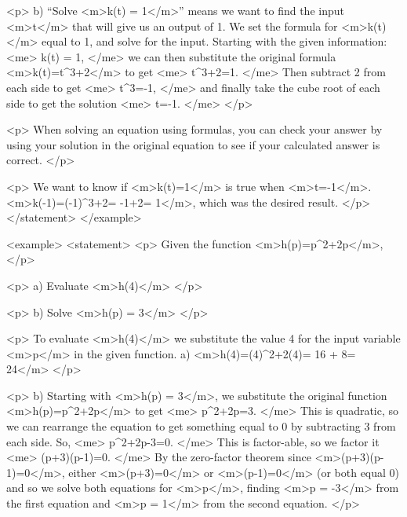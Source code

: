                 <p>
                    b) “Solve <m>k(t) = 1</m>” means we want to find the input <m>t</m> that will give us an output of 1.
                    We set the formula for <m>k(t)</m> equal to 1, and solve for the input.
                    Starting with the given information:
                    <me>
                        k(t) = 1,
                    </me>
                    we can then substitute the original formula <m>k(t)=t^{3}+2</m> to get
                    <me>
                        t^{3}+2=1.
                    </me>
                    Then subtract 2 from each side to get
                    <me>
                        t^{3}=-1,
                    </me>
                    and finally take the cube root of each side to get the solution
                    <me>
                        t=-1.
                    </me>
                </p>

                <p>
                    When solving an equation using formulas, you can check your answer by using your solution in the original equation to see if your calculated answer is correct.
                </p>

                <p>
                    We want to know if <m>k(t)=1</m> is true when <m>t=-1</m>.
                    <m>k(-1)=(-1)^{3}+2= -1+2= 1</m>, which was the desired result.
                </p>
            </statement>
        </example>

        <example>
            <statement>
                <p>
                    Given the function <m>h(p)=p^{2}+2p</m>,
                </p>

                <p>
                    a) Evaluate <m>h(4)</m>
                </p>

                <p>
                    b) Solve <m>h(p) = 3</m>
                </p>

                <p>
                    To evaluate <m>h(4)</m> we substitute the value 4 for the input variable <m>p</m> in the given function.
                    a) <m>h(4)=(4)^{2}+2(4)= 16 + 8= 24</m>
                </p>

                <p>
                    b) Starting with <m>h(p) = 3</m>, we substitute the original function <m>h(p)=p^{2}+2p</m> to get
                    <me>
                        p^{2}+2p=3.
                    </me>
                    This is quadratic, so we can rearrange the equation to get something equal to 0 by subtracting 3 from each side.
                    So,
                    <me>
                        p^{2}+2p-3=0.
                    </me>
                    This is factor-able, so we factor it
                    <me>
                        (p+3)(p-1)=0.
                    </me>
                    By the zero-factor theorem since <m>(p+3)(p-1)=0</m>, either <m>(p+3)=0</m> or <m>(p-1)=0</m> (or both equal 0) and so we solve both equations for <m>p</m>, finding <m>p = -3</m> from the first equation and <m>p = 1</m> from the second equation.
                </p>

